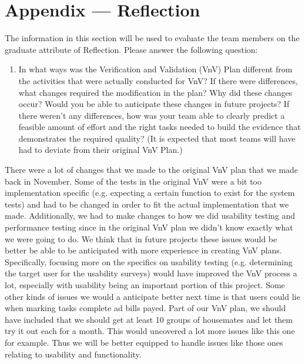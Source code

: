 \documentclass[12pt, titlepage]{article}
\begin{document}

\newpage{}
\section*{Appendix --- Reflection}

The information in this section will be used to evaluate the team members on the
graduate attribute of Reflection.  Please answer the following question:

\begin{enumerate}
  \item In what ways was the Verification and Validation (VnV) Plan different
  from the activities that were actually conducted for VnV?  If there were
  differences, what changes required the modification in the plan?  Why did
  these changes occur?  Would you be able to anticipate these changes in future
  projects?  If there weren't any differences, how was your team able to clearly
  predict a feasible amount of effort and the right tasks needed to build the
  evidence that demonstrates the required quality?  (It is expected that most
  teams will have had to deviate from their original VnV Plan.)
\end{enumerate}

There were a lot of changes that we made to the original VnV plan that we made back in November. Some of the tests in the original VnV were a bit too implementation specific (e.g. expecting a certain function to exist for the system tests) and had to be changed in order to fit the actual implementation that we made. Additionally, we had to make changes to how we did usability testing and performance testing since in the original VnV plan we didn't know exactly what we were going to do. We think that in future projects these issues would be better be able to be anticipated with more experience in creating VnV plans. Specifically, focusing more on the specifics on usability testing (e.g. determining the target user for the usability surveys) would have improved the VnV process a lot, especially with usability being an important portion of this project. Some other kinds of issues we would a anticipate better next time is that users could lie when marking tasks complete ad bills payed. Part of our VnV plan, we should have included that we should get at least 10 groups of housemates and let them try it out each for a month. This would uncovered a lot more issues like this one for example. Thus we will be better equipped to handle issues like those ones relating to usability and functionality.
\end{document}
